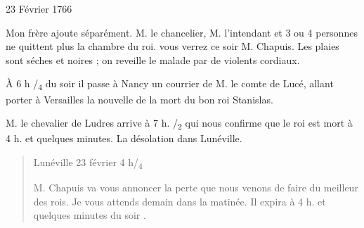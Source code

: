 \begin{diary}{23 Février 1766}{}
\begin{quote}
        \end{quote}

                           Mon frère ajoute séparément. \og
                              M. le chancelier, M. l'intendant et 3 ou 4
                              personnes ne quittent plus la chambre du roi.
                              vous verrez ce soir M. Chapuis.
                              Les plaies
                              sont séches et noires ; on reveille le
                              malade par de violents cordiaux.  \fg{}
                        \bigskip


                         À 6
                              h /\textsubscript{4} du soir il
                           passe à Nancy un courrier
                           de M. le comte de Lucé, allant
                           porter à Versailles
                           la nouvelle de la mort du bon roi
                              Stanislas. \bigskip



                           M. le chevalier de Ludres arrive à 7 h. /\textsubscript{2} qui
                           nous confirme que le roi
                           est mort à 4 h. et
                              quelques minutes. La désolation dans Lunéville. \bigskip


                        \begin{quote}\begin{flushright}Lunéville
                              23 février 4 h/\textsubscript{4}\end{flushright}
                              M. Chapuis va vous
                              annoncer la perte que
                              nous venons de faire du meilleur des rois. Je
                              vous attends demain dans la matinée.
                                  Il expira
                                    à 4 h. et
                                       quelques minutes
                                       du soir
                                 .
                           \bigskip

        \end{quote}


\end{diary}
